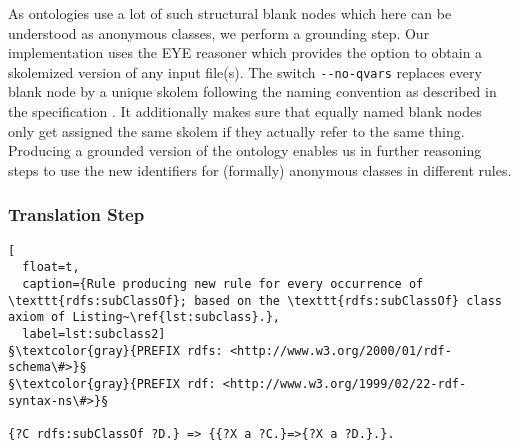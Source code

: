 As \owl ontologies use a lot of such structural blank nodes which here can be understood as anonymous classes, we perform a grounding step.
Our implementation uses the EYE reasoner which provides the option to obtain a skolemized version of any input
\nthree file(s). 
The switch \verb!--no-qvars! replaces every blank node by a unique skolem \iri following the naming convention as described in the \rdf specification \cite{rdf}.
It additionally makes sure that equally named blank nodes only get assigned the same skolem \iri if they actually refer to 
the same thing. Producing a grounded version of the ontology enables us in further reasoning steps to use the 
new identifiers for (formally) anonymous classes in different rules.

\subsubsection{Translation Step}

 \begin{lstlisting}[
  float=t,
  caption={Rule producing new rule for every occurrence of \texttt{rdfs:subClassOf}; based on the \texttt{rdfs:subClassOf} class axiom of Listing~\ref{lst:subclass}.},
  label=lst:subclass2]
§\textcolor{gray}{PREFIX rdfs: <http://www.w3.org/2000/01/rdf-schema\#>}§
§\textcolor{gray}{PREFIX rdf: <http://www.w3.org/1999/02/22-rdf-syntax-ns\#>}§

{?C rdfs:subClassOf ?D.} => {{?X a ?C.}=>{?X a ?D.}.}.
\end{lstlisting}



